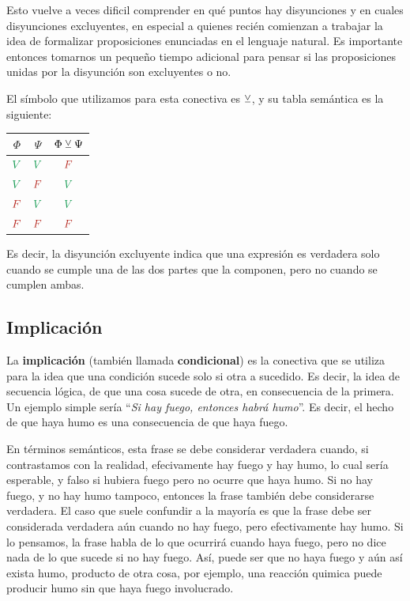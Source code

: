 Esto vuelve a veces dificil comprender en qué puntos hay disyunciones y en
cuales disyunciones excluyentes, en especial a quienes recién comienzan a
trabajar la idea de formalizar proposiciones enunciadas en el lenguaje natural.
Es importante entonces tomarnos un pequeño tiempo adicional para pensar si las
proposiciones unidas por la disyunción son excluyentes o no.

El símbolo que utilizamos para esta conectiva es $\veebar$, y su tabla semántica
es la siguiente:

\begin{tabular}{ c | c | c }
    \textbf{$\Phi$} & \textbf{$\Psi$} & \textbf{$\Phi \veebar \Psi$}\\
    \hline
    $\ltrue$  & $\ltrue$  & $\lfalse$ \\
    $\ltrue$  & $\lfalse$ & $\ltrue$  \\
    $\lfalse$ & $\ltrue$  & $\ltrue$  \\
    $\lfalse$ & $\lfalse$ & $\lfalse$ \\
\end{tabular}

Es decir, la disyunción excluyente indica que una expresión es verdadera solo
cuando se cumple una de las dos partes que la componen, pero no cuando se
cumplen ambas.

\subsection{Implicación}
\label{chap:logica_proposicional:subsec:then}

La \textbf{implicación} (también llamada \textbf{condicional}) es la conectiva
que se utiliza para la idea que una condición sucede solo si otra a sucedido. Es
decir, la idea de secuencia lógica, de que una cosa sucede de otra, en
consecuencia de la primera. Un ejemplo simple sería ``\textit{Si hay fuego,
entonces habrá humo}''. Es decir, el hecho de que haya humo es una consecuencia
de que haya fuego.

En términos semánticos, esta frase se debe considerar verdadera cuando, si
contrastamos con la realidad, efecivamente hay fuego y hay humo, lo cual sería
esperable, y falso si hubiera fuego pero no ocurre que haya humo. Si no hay
fuego, y no hay humo tampoco, entonces la frase también debe considerarse
verdadera. El caso que suele confundir a la mayoría es que la frase debe ser
considerada verdadera aún cuando no hay fuego, pero efectivamente hay humo. Si
lo pensamos, la frase habla de lo que ocurrirá cuando haya fuego, pero no dice
nada de lo que sucede si no hay fuego. Así, puede ser que no haya fuego y aún
así exista humo, producto de otra cosa, por ejemplo, una reacción quimica puede
producir humo sin que haya fuego involucrado.

